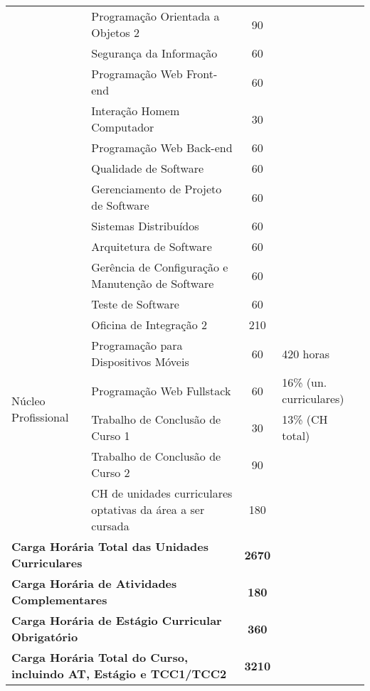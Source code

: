\begin{quadro}[ht!]
\begin{tabular}{|l|l|c|p{3.2cm}|}
\cline{2-3} & Programação Orientada a Objetos 2 & 90 & \\
\cline{2-3} & Segurança da Informação & 60 & \\
\cline{2-3} & Programação Web Front-end & 60 & \\
\cline{2-3} & Interação Homem Computador & 30 & \\
\cline{2-3} & Programação Web Back-end & 60 & \\
\cline{2-3} & Qualidade de Software & 60 & \\
\cline{2-3} & Gerenciamento de Projeto de Software & 60 & \\
\cline{2-3} & Sistemas Distribuídos & 60 & \\
\cline{2-3} & Arquitetura de Software & 60 & \\
\cline{2-3} & Gerência de Configuração e Manutenção de Software & 60 & \\
\cline{2-3} & Teste de Software  & 60 & \\
\cline{2-3} & Oficina de Integração 2 & 210 & \\
\hline
\multirow{4}{*}{Núcleo Profissional} & Programação para Dispositivos Móveis & 60 & 420 horas  \\
\cline{2-3} & Programação Web Fullstack & 60 & 16\% (un. curriculares)\\
\cline{2-3} & Trabalho de Conclusão de Curso 1 & 30 & 13\% (CH total)\\
\cline{2-3} & Trabalho de Conclusão de Curso 2 & 90 & \\
\cline{2-3} & CH de unidades curriculares optativas da área a ser cursada & 180 & \\
\hline
\multicolumn{2}{|l|}{\textbf{Carga Horária Total das Unidades Curriculares}} & \textbf{2670} &  \\\hline
\multicolumn{2}{|l|}{\textbf{Carga Horária de Atividades Complementares}} & \textbf{180} &  \\\hline
\multicolumn{2}{|l|}{\textbf{Carga Horária de Estágio Curricular Obrigatório}} & \textbf{360} &  \\\hline
\multicolumn{2}{|l|}{\textbf{Carga Horária Total do Curso, incluindo AT, Estágio e TCC1/TCC2}} & \textbf{3210} & \\\hline
\end{tabular}
\end{quadro}
